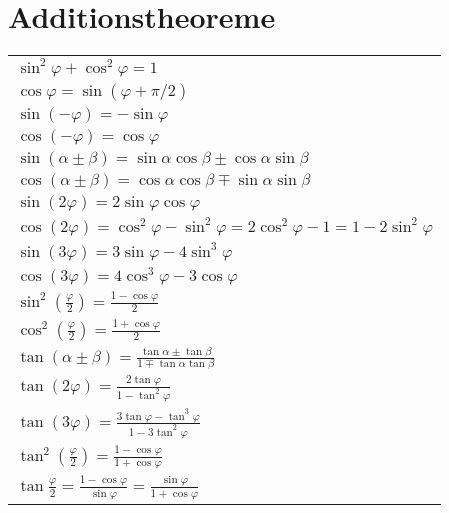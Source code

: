 \documentclass[german, 10pt, a4paper, twocolumn]{scrartcl}
\theoremstyle{definition}
\begin{document}
\section{Additionstheoreme}

\small
\begin{tabular}{l}
 $\sin^2\varphi+\cos^2\varphi=1$\\
 $\cos\varphi=\sin(\varphi+\pi/2)$\\
 $\sin(-\varphi)=-\sin\varphi$\\
 $\cos(-\varphi)=\cos\varphi$\\
 $\sin(\alpha\pm\beta)=\sin\alpha\cos\beta\pm\cos\alpha\sin\beta$\\
 $\cos(\alpha\pm\beta)=\cos\alpha\cos\beta\mp\sin\alpha\sin\beta$\\
 $\sin(2\varphi)=2\sin\varphi\cos\varphi$\\
 $\cos(2\varphi)=\cos^2\varphi-\sin^2\varphi=2\cos^2\varphi-1=1-2\sin^2\varphi$\\
 $\sin(3\varphi)=3\sin\varphi-4\sin^3\varphi$\\
 $\cos(3\varphi)=4\cos^3\varphi-3\cos\varphi$\\
 $\sin^2(\frac{\varphi}{2})=\frac{1-\cos\varphi}{2}$\\
 $\cos^2(\frac{\varphi}{2})=\frac{1+\cos\varphi}{2}$\\
 $\tan(\alpha\pm\beta)=\frac{\tan\alpha\pm\tan\beta}{1\mp\tan\alpha\tan\beta}$\\
 $\tan(2\varphi)=\frac{2\tan\varphi}{1-\tan^2\varphi}$\\
 $\tan(3\varphi)=\frac{3\tan\varphi-\tan^3\varphi}{1-3\tan^2\varphi}$\\
 $\tan^2(\frac{\varphi}{2})=\frac{1-\cos\varphi}{1+\cos\varphi}$\\
 $\tan\frac{\varphi}{2}=\frac{1-\cos\varphi}{\sin\varphi}=\frac{\sin\varphi}{1+\cos\varphi}$
\end{tabular}
\normalsize
\end{document}
